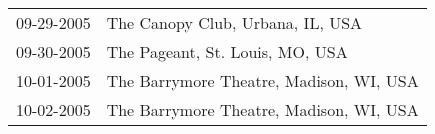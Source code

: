 \begin{supertabular}{ll}
 09-29-2005 &         The Canopy Club, Urbana, IL, USA \\
 09-30-2005 &          The Pageant, St. Louis, MO, USA \\
 10-01-2005 &  The Barrymore Theatre, Madison, WI, USA \\
 10-02-2005 &  The Barrymore Theatre, Madison, WI, USA \\
\end{supertabular}
